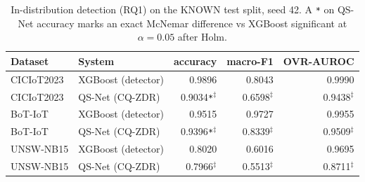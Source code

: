 \begin{table}[t]
\centering
\caption{In-distribution detection (RQ1) on the KNOWN test split, seed 42. A \texttt{*} on QS-Net accuracy marks an exact McNemar difference vs XGBoost significant at $\alpha = 0.05$ after Holm.}
\label{tab:in-distribution-detection}
\begin{tabular}{llrrr}
\toprule
Dataset & System & accuracy & macro-F1 & OVR-AUROC \\
\midrule
CICIoT2023 & XGBoost (detector) & 0.9896 & 0.8043 & 0.9990 \\
CICIoT2023 & QS-Net (CQ-ZDR) & 0.9034\texttt{*}$^\ddag$ & 0.6598$^\ddag$ & 0.9438$^\ddag$ \\
BoT-IoT & XGBoost (detector) & 0.9515 & 0.9727 & 0.9955 \\
BoT-IoT & QS-Net (CQ-ZDR) & 0.9396\texttt{*}$^\ddag$ & 0.8339$^\ddag$ & 0.9509$^\ddag$ \\
UNSW-NB15 & XGBoost (detector) & 0.8020 & 0.6016 & 0.9695 \\
UNSW-NB15 & QS-Net (CQ-ZDR) & 0.7966$^\ddag$ & 0.5513$^\ddag$ & 0.8711$^\ddag$ \\
\bottomrule
\end{tabular}
\end{table}
